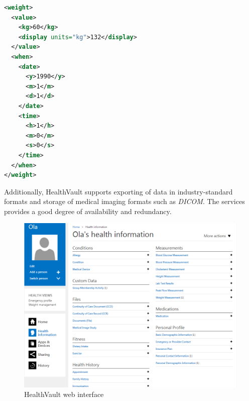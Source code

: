 \begin{lstlisting}[language=XML]
<weight>
  <value>
    <kg>60</kg>
    <display units="kg">132</display>
  </value>
  <when>
    <date>
      <y>1990</y>
      <m>1</m>
      <d>1</d>
    </date>
    <time>
      <h>1</h>
      <m>0</m>
      <s>0</s>
    </time>
  </when>
</weight>
\end{lstlisting}



Additionally, HealthVault supports exporting of data in industry-standard formats and storage
of medical imaging formats such as \textit{DICOM}. The services provides a good degree of availability and redundancy.

\begin{figure}[h]
\begin{center}
\includegraphics[scale=0.50]{../Figures/hv-page.png}
\end{center}
\caption{HealthVault web interface}
\label{figure:hv-page}
\end{figure}

